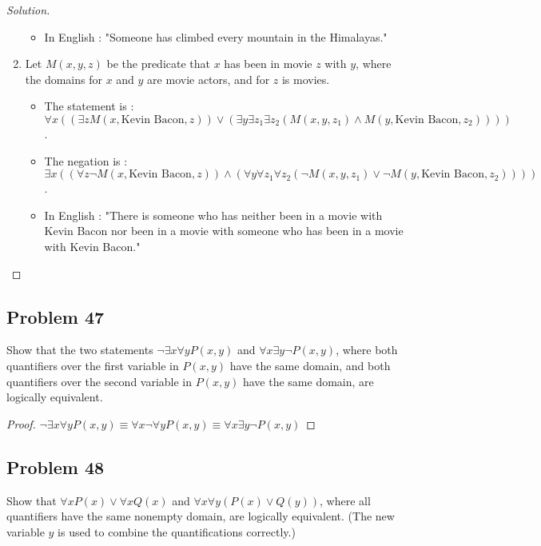 \documentclass{article}
\newenvironment{solution}{\renewcommand\qedsymbol{}\begin{proof}[Solution]}{\end{proof}}
\begin{document}
\begin{solution}
\begin{enumerate}[leftmargin=16pt, topsep = 8pt]
\begin{itemize}[leftmargin=0pt, topsep = 0pt]
\item In English : "Someone has climbed every mountain in the Himalayas."
\end{itemize}
\item Let $M(x,y,z)$ be the predicate that $x$ has been in movie $z$ with $y$, where the domains for $x$ and $y$ are movie actors, and for $z$ is movies.
\begin{itemize}[leftmargin=0pt, topsep = 0pt]
\item The statement is :\\$\forall x((\exists zM(x,\textrm{Kevin Bacon},z)) \lor (\exists y \exists z_1 \exists z_2(M(x,y,z_1) \land M(y,\textrm{Kevin Bacon},z_2))))$.
\item The negation is :\\$\exists x((\forall z \neg M(x,\textrm{Kevin Bacon},z)) \land (\forall y \forall z_1 \forall z_2(\neg M(x,y,z_1) \lor \neg M(y,\textrm{Kevin Bacon},z_2))))$.
\item In English : "There is someone who has neither been in a movie with Kevin Bacon nor been in a movie with someone who has been in a movie with Kevin Bacon."
\end{itemize}
\end{enumerate}
\end{solution}

\subsection*{Problem 47}
Show that the two statements $\neg \exists x \forall yP(x,y)$ and $\forall x \exists y \neg P(x,y)$, where both quantifiers over the first variable in $P(x,y)$ have the same domain, and both quantifiers over the second variable in $P(x,y)$ have the same domain, are logically equivalent.

\begin{proof}
$\neg \exists x \forall yP(x,y) \equiv \forall x \neg \forall yP(x,y) \equiv \forall x \exists y \neg P(x,y)$
\end{proof}

\clearpage
\subsection*{Problem 48}
Show that $\forall xP(x) \lor \forall xQ(x)$ and $\forall x \forall y(P(x) \lor Q(y))$, where all quantifiers have the same nonempty domain, are logically equivalent. (The new variable $y$ is used to combine the quantifications correctly.)
\end{document}
